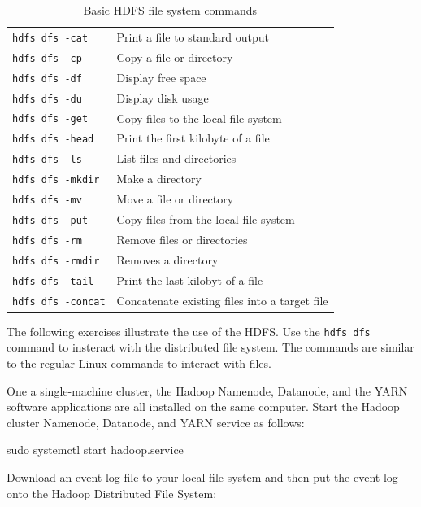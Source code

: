 \begin{table}
\centering

\renewcommand{\arraystretch}{1.25}
\small
\begin{tabular}{l|l} \hline
\texttt{hdfs dfs -cat} & Print a file to standard output \\
\texttt{hdfs dfs -cp} & Copy a file or directory\\
\texttt{hdfs dfs -df} & Display free space \\
\texttt{hdfs dfs -du} & Display disk usage \\
\texttt{hdfs dfs -get} & Copy files to the local file system \\
\texttt{hdfs dfs -head} & Print the first kilobyte of a file \\
\texttt{hdfs dfs -ls} & List files and directories \\
\texttt{hdfs dfs -mkdir} & Make a directory \\
\texttt{hdfs dfs -mv} & Move a file or directory \\
\texttt{hdfs dfs -put} & Copy files from the local file system \\
\texttt{hdfs dfs -rm} & Remove files or directories \\
\texttt{hdfs dfs -rmdir} & Removes a directory \\
\texttt{hdfs dfs -tail} & Print the last kilobyt of a file \\
\texttt{hdfs dfs -concat} & Concatenate existing files into a target file \\ \hline
\end{tabular}
\caption{Basic HDFS file system commands}
\label{tab:hdfscommands}
\end{table}

The following exercises illustrate the use of the HDFS. Use the \texttt{hdfs dfs} command to insteract with the distributed file system. The commands are similar to the regular Linux commands to interact with files.

One a single-machine cluster, the Hadoop Namenode, Datanode, and the YARN software applications are all installed on the same computer. Start the Hadoop cluster Namenode, Datanode, and YARN service as follows:

\begin{bashcode}
sudo systemctl start hadoop.service
\end{bashcode}

Download an event log file to your local file system and then put the event log onto the Hadoop Distributed File System:

